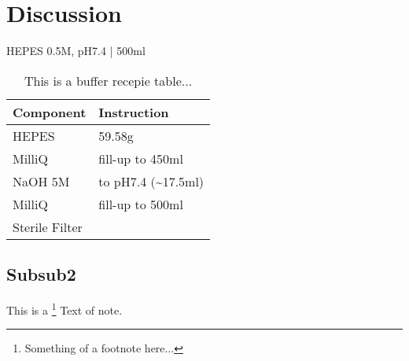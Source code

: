 \section{Discussion}

\lipsum[9]

\begin{table}
\centering
\caption{HEPES 0.5M, pH7.4  |  500ml}
\begin{tabular}{ll}
\toprule
     Component &        Instruction \\
\midrule
         HEPES &             59.58g \\
        MilliQ &   fill-up to 450ml \\
       NaOH 5M & to pH7.4 (\textasciitilde 17.5ml) \\
        MilliQ &   fill-up to 500ml \\
Sterile Filter &                    \\
\bottomrule
\end{tabular}
\caption*{
This is a buffer recepie table...
}
\end{table}

\subsection{Subsub2}
\lipsum[100]
This is a \footnote{Something of a footnote here...} Text of note.

